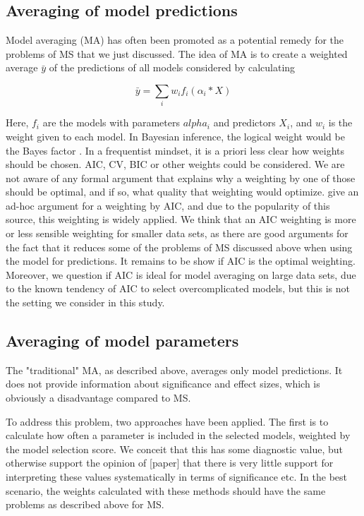 \documentclass[5p]{elsarticle}
\begin{document}
\subsection{Averaging of model predictions}

Model averaging (MA) has often been promoted as a potential remedy for the problems of MS that we just discussed. The idea of MA is to create a weighted average $\bar{y}$ of the predictions of all models considered by calculating

\begin{equation}
\bar{y} = \sum_i w_i f_i(\alpha_i * X)
\label{eq: averaged predictions}
\end{equation}

Here, ${f_i}$ are the models with parameters $alpha_i$ and predictors $X_i$, and $w_i$ is the weight given to each model. In Bayesian inference, the logical weight would be the Bayes factor \citep{Kass-BayesFactors-1995}. In a frequentist mindset, it is a priori less clear how weights should be chosen. AIC, CV, BIC or other weights could be considered. We are not aware of any formal argument that explains why a weighting by one of those should be optimal, and if so, what quality that weighting would optimize. \citet{Burnham-Modelselectionand-2002} give an ad-hoc argument for a weighting by AIC, and due to the popularity of this source, this weighting is widely applied. We think that an AIC weighting is more or less sensible weighting for smaller data sets, as there are good arguments for the fact that it reduces some of the problems of MS discussed above when using the model for predictions. It remains to be show if AIC is the optimal weighting. Moreover, we question if AIC is ideal for model averaging on large data sets, due to the known tendency of AIC to select overcomplicated models, but this is not the setting we consider in this study.


\subsection{Averaging of model parameters}

The "traditional" MA, as described above, averages only model predictions. It does not provide information about significance and effect sizes, which is obviously a disadvantage compared to MS. 

To address this problem, two approaches have been applied. The first is to calculate how often a parameter is included in the selected models, weighted by the model selection score. We conceit that this has some diagnostic value, but otherwise support the opinion of [paper] that there is very little support for interpreting these values systematically in terms of significance etc. In the best scenario, the weights calculated with these methods should have the same problems as described above for MS.
\end{document}
